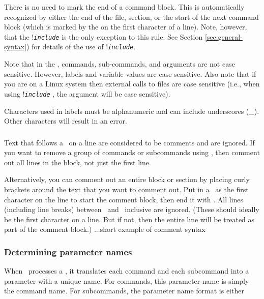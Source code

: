There is no need to mark the end of a command block. This is automatically recognized by either the end of the file, section, or the start of the next command block (which is marked by the \command{} on the first character of a line). Note, however, that the !\texttt{\emph{include}} is the only exception to this rule. See Section \ref{sec:general-syntax}) for details of the use of !\texttt{\emph{include}}. 

Note that in the \config, commands, sub-commands, and arguments are not case sensitive. However, labels and variable values are case sensitive. Also note that if you are on a Linux system then external calls to files are case sensitive (i.e., when using !\texttt{\emph{include}} , the argument  will be case sensitive). 

Characters used in labels must be alphanumeric and can include underscores (\_). Other characters will result in an error.

\subsubsection{}
\CH
Text that follows a \commentline\ on a line are considered to be comments and are ignored. If you want to remove a group of commands or subcommands using \commentline, then comment out all lines in the block, not just the first line. 

Alternatively, you can comment out an entire block or section by placing curly brackets around the text that you want to comment out. Put in a \commentstart\ as the first character on the line to start the comment block, then end it with \commentend. All lines (including line breaks) between \commentstart\ and \commentend\ inclusive are ignored. (These should ideally be the first character on a line. But if not, then the entire line will be treated as part of the comment block.)
\EX ...short example of comment syntax \EXend

\subsubsection{Determining parameter names\label{sec:parameter-names}}
\CH
When \CNAME\ processes a \config, it translates each command and each subcommand into a parameter with a unique name. For commands, this parameter name is simply the command name. For subcommands, the parameter name format is either 


